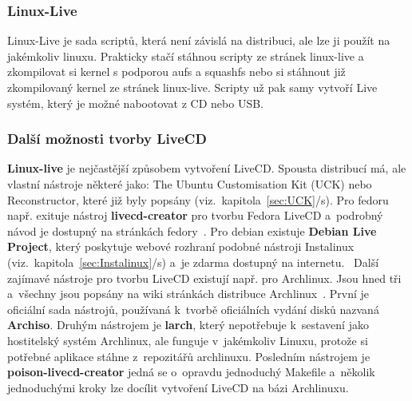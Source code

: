 \documentclass[a4paper,12pt]{article}
\newcommand{\sectionV}[1]{\section{\uppercase{#1}}}	%
\newcommand{\odkazNaKapitolu}[1]{(viz.~kapitola~\ref{#1}/s\pageref{#1})}
\renewcommand{\b}[1]{\textbf{#1}} %
\renewcommand{\part}[1]{
	\refstepcounter{part}
	\addcontentsline{toc}{section}{\thepart~~\uppercase{#1}}%
\clearpage
\normalfont
	\vspace*{9cm}
	\begin{center}\huge \bfseries\thepart. \uppercase{#1}\end{center}%
	\markboth{}{}\par
\nobreak
\clearpage	
}
\begin{document}
\subsubsection{Linux-Live}
Linux-Live je sada scriptů, která není závislá na distribuci, ale lze ji použít na jakémkoliv linuxu. Prakticky stačí stáhnou scripty ze stránek linux-live a zkompilovat si kernel s podporou aufs a squashfs nebo si stáhnout již zkompilovaný kernel ze stránek linux-live. Scripty už pak samy vytvoří Live systém, který je možné nabootovat z CD nebo USB.


\subsubsection{Další možnosti tvorby LiveCD}
\b{Linux-live} je nejčastější způsobem vytvoření LiveCD. Spousta distribucí má, ale vlastní nástroje některé jako: The Ubuntu Customisation Kit (UCK) nebo Reconstructor, které již byly popsány \odkazNaKapitolu{sec:UCK}. Pro fedoru např. exituje nástroj \b{livecd-creator} pro tvorbu Fedora LiveCD a~podrobný návod je dostupný na stránkách fedory~\cite{FedoraLiveCDproject}. Pro debian existuje \textbf{Debian Live Project}, který poskytuje webové rozhraní podobné nástroji Instalinux \odkazNaKapitolu{sec:Instalinux} a~je zdarma dostupný na internetu.~\cite{DebianLiveProject}
Další zajímavé nástroje pro tvorbu LiveCD existují např. pro Archlinux. Jsou hned tři a~všechny jsou popsány na wiki stránkách distribuce Archlinux~\cite{ArchWiki-BuildLiveCD}. První je oficiální sada nástrojů, používaná k~tvorbě oficiálních vydání disků nazvaná \b{Archiso}. Druhým nástrojem je \b{larch}, který nepotřebuje k~sestavení jako hostitelský systém Archlinux, ale funguje v~jakémkoliv Linuxu, protože si potřebné aplikace stáhne z~repozitářů archlinuxu. Posledním nástrojem je \textbf{poison-livecd-creator} jedná se o~opravdu jednoduchý Makefile a~několik jednoduchými kroky lze docílit vytvoření LiveCD na bázi Archlinuxu.

\end{document}
